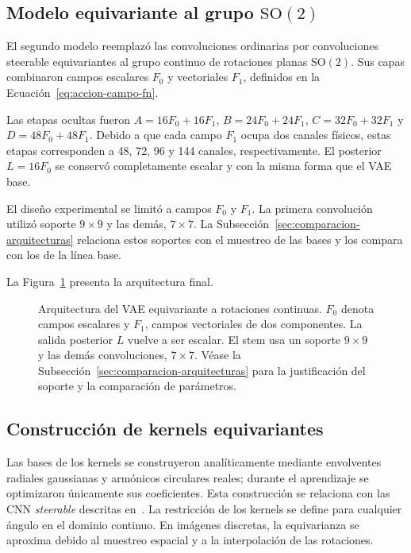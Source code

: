 \subsection{Modelo equivariante al grupo \texorpdfstring{$\mathrm{SO}(2)$}{SO(2)}}
\label{sec:modelo-so2}

El segundo modelo reemplazó las convoluciones ordinarias por convoluciones
steerable equivariantes al grupo continuo de rotaciones planas
\(\mathrm{SO}(2)\). Sus capas combinaron campos escalares \(F_0\) y
vectoriales \(F_1\), definidos en la
Ecuación~\eqref{eq:accion-campo-fn}.

Las etapas ocultas fueron \(A=16F_0+16F_1\),
\(B=24F_0+24F_1\), \(C=32F_0+32F_1\) y
\(D=48F_0+48F_1\). Debido a que cada campo \(F_1\) ocupa dos canales físicos,
estas etapas corresponden a 48, 72, 96 y 144 canales, respectivamente. El
posterior \(L=16F_0\) se conservó completamente escalar y con la misma forma
que el VAE base.

El diseño experimental se limitó a campos \(F_0\) y \(F_1\). La primera
convolución utilizó soporte \(9\times9\) y las demás,
\(7\times7\). La Subsección~\ref{sec:comparacion-arquitecturas} relaciona estos
soportes con el muestreo de las bases y los compara con los de la línea base.

La Figura~\ref{fig:arquitectura-vae-so2} presenta la arquitectura final.

\begin{figure}[htbp]
    \centering
    \resizebox{\textwidth}{!}{}
    \caption[Arquitectura del VAE equivariante a rotaciones continuas.]{Arquitectura del VAE equivariante a rotaciones continuas. \(F_0\)
    denota campos escalares y \(F_1\), campos vectoriales de dos componentes.
    La salida posterior \(L\) vuelve a ser escalar. El stem usa un soporte
    \(9\times9\) y las demás convoluciones, \(7\times7\). Véase la
    Subsección~\ref{sec:comparacion-arquitecturas} para la justificación del soporte y la
    comparación de parámetros.}
    \label{fig:arquitectura-vae-so2}
\end{figure}

\FloatBarrier
\subsection{Construcción de kernels equivariantes}

Las bases de los kernels se construyeron analíticamente mediante envolventes
radiales gaussianas y armónicos circulares reales; durante el aprendizaje se
optimizaron únicamente sus coeficientes. Esta construcción se relaciona con
las CNN \emph{steerable} descritas en~\cite{cohen_steerable_2016}.
La restricción de los kernels se define para cualquier ángulo en el dominio
continuo. En imágenes discretas, la equivarianza se aproxima debido al muestreo
espacial y a la interpolación de las rotaciones.

